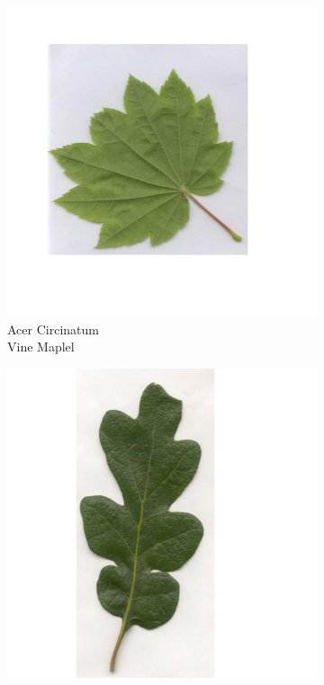 \documentclass[12pt]{article}
\begin{document}
\begin{figure}[b!]
    \centering
    \begin{subfigure}[b]{0.3\textwidth}
        \includegraphics[width=\textwidth]{circinatum_sample.jpg}
        \caption{Acer Circinatum\\Vine Maplel}
    \end{subfigure}
    \begin{subfigure}[b]{0.3\textwidth}
        \includegraphics[width=\textwidth]{garryana_sample.jpg}

\end{subfigure}
\end{figure}
\end{document}
